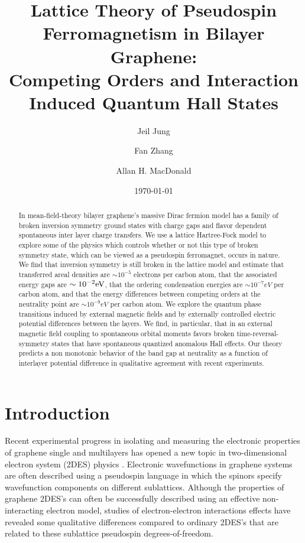 \documentclass[twocolumn,prb,showpacs,preprintnumbers,amsmath,amssymb]{revtex4}
\begin{document}
\title{Lattice Theory of Pseudospin Ferromagnetism in Bilayer Graphene:\\
 Competing Orders and Interaction Induced Quantum Hall States}
\author{Jeil Jung} 
\author{Fan Zhang} 
\author{Allan H. MacDonald}
\date{\today{}}
\begin{abstract}
In mean-field-theory bilayer graphene's massive Dirac fermion model has a family of broken inversion symmetry ground states
with charge gaps and flavor dependent spontaneous inter layer charge transfers.  
We use a lattice Hartree-Fock model to explore some of the physics which controls whether or not this type of broken 
symmetry state, which can be viewed as a pseudospin ferromagnet,  
occurs in nature.  
We find that inversion symmetry is still broken in the lattice model 
and estimate that transferred areal densities are $\sim 10^{-5}$ electrons per carbon atom, 
that the associated energy gaps are $\sim 10^{-2} {\rm eV}$,  that the 
ordering condensation energies are $\sim  10^{-7} eV$ per carbon atom,
and that the energy differences between competing orders at the neutrality point are 
 $\sim 10^{-9} eV$ per carbon atom.  
We explore the quantum phase transitions induced 
by external magnetic fields and by externally controlled electric potential differences
between the layers.  
We find, in particular, that in an external magnetic field
coupling to spontaneous orbital moments favors broken time-reversal-symmetry states that 
have spontaneous quantized anomalous Hall effects.   
Our theory predicts a non monotonic behavior of the band gap at neutrality as a function 
of interlayer potential difference 
in qualitative agreement with recent experiments.
\end{abstract}

\maketitle


\section{Introduction}
Recent experimental progress 
\cite{geim,kim}
in isolating and measuring the electronic properties of graphene single and multilayers 
has opened a new topic in two-dimensional electron system (2DES) physics \cite{geim_macdonald}. 
Electronic wavefunctions in graphene systems are often described using a pseudospin language
in which the spinors specify wavefunction components on different sublattices.
Although the properties of graphene 2DES's can often be successfully described using an effective  
non-interacting electron model, studies of 
electron-electron interactions effects have revealed some qualitative 
differences compared to ordinary 2DES's\cite{yafis,chiral_2d} that are related to these sublattice pseudospin 
degrees-of-freedom.  
\end{document}
